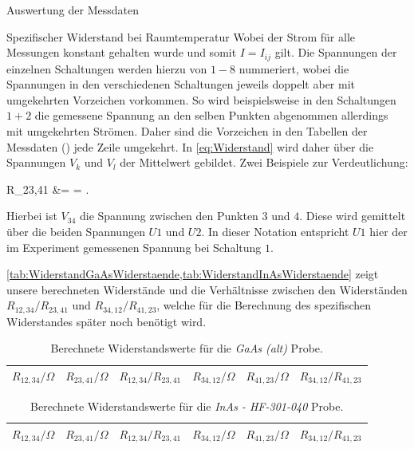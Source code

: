 \documentclass[pdftex, a4paper,11pt, twoside, ngerman]{report}
\begin{document}
\begin{chapter}{Auswertung der Messdaten}
\begin{section}{Spezifischer Widerstand bei Raumtemperatur}
      Wobei der Strom für alle Messungen konstant gehalten wurde und somit
      $I=I_{ij}$ gilt.
      Die Spannungen der einzelnen Schaltungen werden hierzu von $1-8$
      nummeriert, wobei die Spannungen in den verschiedenen Schaltungen jeweils
      doppelt aber mit umgekehrten Vorzeichen vorkommen.
      So wird beispielsweise in den Schaltungen $1+2$ die gemessene Spannung an
      den selben Punkten abgenommen allerdings mit umgekehrten Strömen.
      Daher sind die Vorzeichen in den Tabellen der Messdaten
      () jede Zeile umgekehrt.
      In \cref{eq:Widerstand} wird daher über die Spannungen $V_{k}$ und $V_{l}$
      der Mittelwert gebildet.
      Zwei Beispiele zur Verdeutlichung:
      
             {R_{23,41} &=  = .}
             
      Hierbei ist $V_{34}$ die Spannung zwischen den Punkten $3$ und $4$.
      Diese wird gemittelt über die beiden Spannungen $U1$ und $U2$.
      In dieser Notation entspricht $U1$ hier der im Experiment gemessenen
      Spannung bei Schaltung $1$.
      
      \cref{tab:WiderstandGaAsWiderstaende,tab:WiderstandInAsWiderstaende}
      zeigt unsere berechneten Widerstände und die Verhältnisse zwischen den
      Widerständen $R_{12,34}/R_{23,41}$ und $R_{34,12}/R_{41,23}$, welche für
      die Berechnung des spezifischen Widerstandes später noch benötigt wird.
      \begin{table}[htbp]
        \centering
        \footnotesize
        \begin{tabular}{ccc|ccc}
          $R_{12,34} /\Omega$ & $R_{23,41} /\Omega$ &
          $R_{12,34} / R_{23,41}$ &
          $R_{34,12} /\Omega$ & $R_{41,23} /\Omega$ &
          $R_{34,12} / R_{41,23}$ \\ \hline \hline
          
        \end{tabular}
        \caption{Berechnete Widerstandswerte für die \textit{GaAs (alt)} Probe.}
        \label{tab:WiderstandGaAsWiderstaende}
      \end{table}
      \begin{table}[htbp]
        \centering
        \footnotesize
        \begin{tabular}{ccc|ccc}
          $R_{12,34} /\Omega$ & $R_{23,41} /\Omega$ &
          $R_{12,34} / R_{23,41}$ &
          $R_{34,12} /\Omega$ & $R_{41,23} /\Omega$ &
          $R_{34,12} / R_{41,23}$ \\ \hline \hline
          
        \end{tabular}
        \caption{Berechnete Widerstandswerte für die 
            \textit{InAs - HF-301-040} Probe.}
        \label{tab:WiderstandInAsWiderstaende}
      \end{table}
      

\end{section}
\end{chapter}
\end{document}
